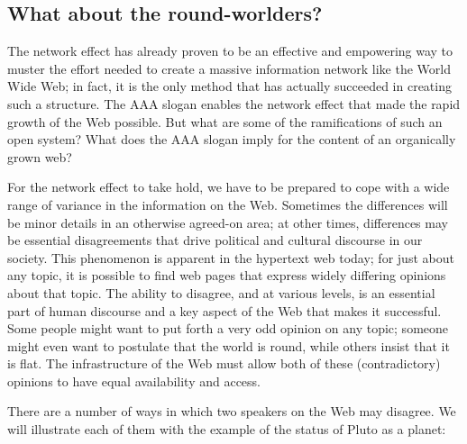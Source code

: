 \subsection{What about the round-worlders?}

The network effect has already proven to be an effective and empowering
way to muster the effort needed to create a massive information network
like the World Wide Web; in fact, it is the only method that has
actually succeeded in creating such a structure. The AAA slogan enables
the network effect that made the rapid growth of the Web possible. But
what are some of the ramifications of such an open system? What does the
AAA slogan imply for the content of an organically grown web?

For the network effect to take hold, we have to be prepared to cope with
a wide range of variance in the information on the Web. Sometimes the
differences will be minor details in an otherwise agreed-on area; at
other times, differences may be essential disagreements that drive
political and cultural discourse in our society. This phenomenon is
apparent in the hypertext web today; for just about any topic, it is
possible to find web pages that express widely differing opinions about
that topic. The ability to disagree, and at various levels, is an
essential part of human discourse and a key aspect of the Web that makes
it successful. Some people might want to put forth a very odd opinion on
any topic; someone might even want to postulate that the world is round,
while others insist that it is flat. The infrastructure of the Web must
allow both of these (contradictory) opinions to have equal availability
and access.

There are a number of ways in which two speakers on the Web may
disagree. We will illustrate each of them with the example of the status
of Pluto as a planet:


